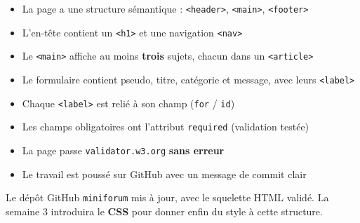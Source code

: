 \documentclass[a4paper,11pt]{article}
\begin{document}
\begin{tcolorbox}[definition, title={Auto-évaluation}]
\begin{itemize}
  \item[$\square$] La page a une structure sémantique : \texttt{<header>}, \texttt{<main>}, \texttt{<footer>}
  \item[$\square$] L'en-tête contient un \texttt{<h1>} et une navigation \texttt{<nav>}
  \item[$\square$] Le \texttt{<main>} affiche au moins \textbf{trois} sujets, chacun dans un \texttt{<article>}
  \item[$\square$] Le formulaire contient pseudo, titre, catégorie et message, avec leurs \texttt{<label>}
  \item[$\square$] Chaque \texttt{<label>} est relié à son champ (\texttt{for} / \texttt{id})
  \item[$\square$] Les champs obligatoires ont l'attribut \texttt{required} (validation testée)
  \item[$\square$] La page passe \texttt{validator.w3.org} \textbf{sans erreur}
  \item[$\square$] Le travail est poussé sur GitHub avec un message de commit clair
\end{itemize}
\end{tcolorbox}

\vspace{6pt}
\begin{tcolorbox}[attention, title={À rendre avant la semaine 3}]
Le dépôt GitHub \texttt{miniforum} mis à jour, avec le squelette HTML validé. La semaine 3 introduira le \textbf{CSS} pour donner enfin du style à cette structure.
\end{tcolorbox}
\end{document}

